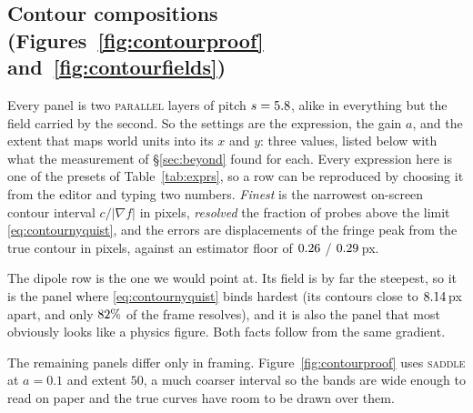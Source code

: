 \subsection{Contour compositions (Figures~\ref{fig:contourproof} and~\ref{fig:contourfields})}

Every panel is two \textsc{parallel} layers of pitch $s=5.8$, alike in
everything but the field carried by the second. So the settings are the expression,
the gain $a$, and the extent that maps world units into its $x$ and $y$: three
values, listed below with what the measurement of \S\ref{sec:beyond} found for
each. Every expression here is one of the presets of Table~\ref{tab:exprs}, so a
row can be reproduced by choosing it from the editor and typing two numbers. \emph{Finest} is the narrowest
on-screen contour interval $c/\lvert\nabla f\rvert$ in pixels, \emph{resolved} the
fraction of probes above the limit \eqref{eq:contournyquist}, and the errors are
displacements of the fringe peak from the true contour in pixels, against an
estimator floor of $0.26$ / $0.29$\,px.



The dipole row is the one we would point at. Its field is by far the steepest, so
it is the panel where \eqref{eq:contournyquist} binds hardest (its contours
close to $8.14$\,px apart, and only $82\%$ of
the frame resolves), and it is also the panel that most obviously looks like a
physics figure. Both facts follow from the same gradient.

The remaining panels differ only in framing. Figure~\ref{fig:contourproof} uses
\textsc{saddle} at $a=0.1$ and extent $50$, a much coarser interval so the bands
are wide enough to read on paper and the true curves have room to be drawn over
them.
